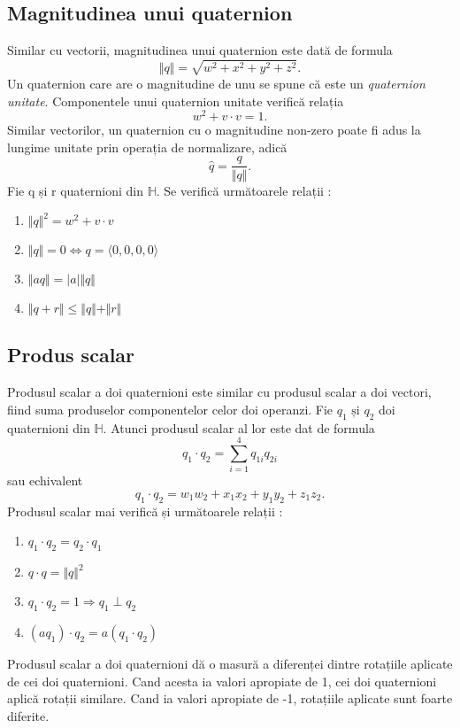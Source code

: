 \subsection{Magnitudinea unui quaternion}
\label{ch1:quaternions:magnitude}
Similar cu vectorii, magnitudinea unui quaternion este dată de formula
\begin{equation}
\Vert q \Vert = \sqrt{w^2 + x^2 + y^2 + z^2}.
\end{equation}
Un quaternion care are o magnitudine de unu se spune că este un
\textit{quaternion unitate}. Componentele unui quaternion unitate verifică
relația
\begin{equation}
w^2 + v \cdot v = 1.
\end{equation}
Similar vectorilor, un quaternion cu o magnitudine
non-zero poate fi adus la lungime unitate prin operația de normalizare, adică
\begin{equation}
\hat{q} = \frac{q}{\Vert q \Vert}.
\end{equation}
Fie q și r quaternioni din $\mathbb{H}$. Se verifică următoarele relații :
\begin{enumerate}
    \item $\Vert q \Vert ^ 2 = w^2 + v \cdot v$
    \item $\Vert q \Vert = 0 \iff q = \langle 0, 0, 0, 0 \rangle$
    \item $\Vert \mathit{a}q \Vert = \vert \mathit{a} \vert \Vert q \Vert$
    \item $\Vert q + r \Vert \leq \Vert q \Vert + \Vert r \Vert$
\end{enumerate}

\subsection{Produs scalar}
\label{ch1:quaternions:scalar_product}
Produsul scalar a doi quaternioni este similar cu produsul scalar a doi vectori,
fiind suma produselor componentelor celor doi operanzi. Fie $q_{1} \text{ și }
q_{2}$ doi quaternioni din $\mathbb{H}$. Atunci produsul scalar al lor este dat de
formula
\begin{equation}
q_{1} \cdot q_{2} = \sum_{i = 1}^{4} q_{1i}q_{2i} 
\end{equation} sau echivalent
\begin{equation}
q_{1} \cdot q_{2} = w_{1}w_{2} + x_{1}x_{2} + y_{1}y_{2} + z_{1}z_{2}.
\end{equation}
Produsul scalar mai verifică și următoarele relații :
\begin{enumerate}
\item $q_1 \cdot q_2 = q_2 \cdot q_1$
\item $q \cdot q = \Vert q \Vert ^ 2$
\item $q_1 \cdot q_2 = 1 \Rightarrow q_1 \perp q_2$
\item $(\mathit{a}q_1) \cdot q_2 = \mathit{a}(q_1 \cdot q_2)$
\end{enumerate}
Produsul scalar a doi quaternioni dă o masură a diferenței dintre rotațiile
aplicate de cei doi quaternioni. Cand acesta ia valori apropiate de 1, cei doi
quaternioni aplică rotații similare. Cand ia valori apropiate de -1, rotațiile
aplicate sunt foarte diferite.

